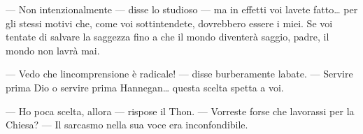 --- Non intenzionalmente --- disse lo studioso --- ma in effetti voi
l\textquotesingle avete fatto\ldots{} per gli stessi motivi che, come
voi sottintendete, dovrebbero essere i miei. Se voi tentate di salvare
la saggezza fino a che il mondo diventerà saggio, padre, il mondo non
l\textquotesingle avrà mai.

--- Vedo che l\textquotesingle incomprensione è radicale! --- disse
burberamente l\textquotesingle abate. --- Servire prima Dio o servire
prima Hannegan\ldots{} questa scelta spetta a voi.

--- Ho poca scelta, allora --- rispose il Thon. --- Vorreste forse che
lavorassi per la Chiesa? --- Il sarcasmo nella sua voce era
inconfondibile.
